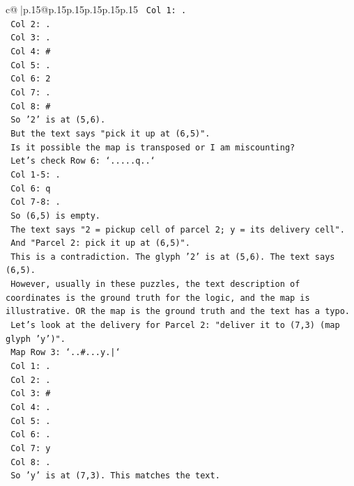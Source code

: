\documentclass{article}
\begin{document}
{\begin{supertabular}{c@{$\;$}|p{.15\linewidth}@{}p{.15\linewidth}p{.15\linewidth}p{.15\linewidth}p{.15\linewidth}p{.15\linewidth}}
{{{\texttt{       Col 1: .} \\
\texttt{       Col 2: .} \\
\texttt{       Col 3: .} \\
\texttt{       Col 4: \#} \\
\texttt{       Col 5: .} \\
\texttt{       Col 6: 2} \\
\texttt{       Col 7: .} \\
\texttt{       Col 8: \#} \\
\texttt{       So '2' is at (5,6).} \\
\texttt{       But the text says "pick it up at (6,5)".} \\
\texttt{       Is it possible the map is transposed or I am miscounting?} \\
\texttt{       Let's check Row 6: `.....q..`} \\
\texttt{       Col 1{-}5: .} \\
\texttt{       Col 6: q} \\
\texttt{       Col 7{-}8: .} \\
\texttt{       So (6,5) is empty.} \\
\texttt{       The text says "2 = pickup cell of parcel 2; y = its delivery cell".} \\
\texttt{       And "Parcel 2: pick it up at (6,5)".} \\
\texttt{       This is a contradiction. The glyph '2' is at (5,6). The text says (6,5).} \\
\texttt{       However, usually in these puzzles, the text description of coordinates is the ground truth for the logic, and the map is illustrative. OR the map is the ground truth and the text has a typo.} \\
\texttt{       Let's look at the delivery for Parcel 2: "deliver it to (7,3) (map glyph 'y')".} \\
\texttt{       Map Row 3: `..\#...y.|`} \\
\texttt{       Col 1: .} \\
\texttt{       Col 2: .} \\
\texttt{       Col 3: \#} \\
\texttt{       Col 4: .} \\
\texttt{       Col 5: .} \\
\texttt{       Col 6: .} \\
\texttt{       Col 7: y} \\
\texttt{       Col 8: .} \\
\texttt{       So 'y' is at (7,3). This matches the text.} \\
}}}
\end{supertabular}}
\end{document}
